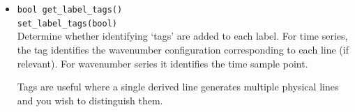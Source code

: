 \documentclass[11pt,a4paper]{article}
\newcommand{\packagefont}{\sffamily}
\newcommand{\CppTransport}{{\packagefont CppTransport}}
\begin{document}
\begin{itemize}
    Two labels are required: one in {\LaTeX} format
    and one in plain text format.
    The {\LaTeX}-format label is used
    if {\LaTeX} labels have been enabled by
    \texttt{set_use_LaTeX()}
    (see~\S\ref{sec:product-standard-options}).
    Otherwise, the plain text label is used.
    
    Labels are used as column headings (if the derived product is a table)
    or displayed on the legend (if the derived product is a plot).
    If no label is set then {\CppTransport} will use a suitable default.
    
    \item \texttt{bool get_label_tags()} \\
    \texttt{set_label_tags(bool)} \\
    \label{method:get_label_tags}
    Determine whether identifying `tags' are added to each label.
    For time series, the tag identifies the wavenumber configuration
    corresponding to each line (if relevant).
    For wavenumber series it identifies the time sample point.
    
    Tags are useful where a single derived line generates multiple physical
    lines and you wish to distinguish them.
\end{itemize}
\end{document}
